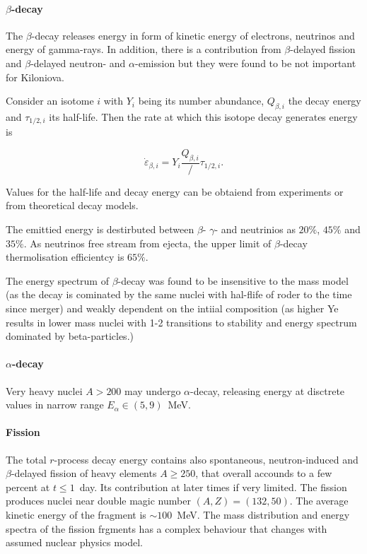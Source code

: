 \documentclass[11pt,a4paper,headinclude=true,DIV=14,BCOR=8mm,chapterprefix,listof=totoc,twoside,openright,abstracton]{scrbook}
\begin{document}
\paragraph{$\beta$-decay}

The $\beta$-decay releases energy in form of kinetic energy of electrons, neutrinos and energy of gamma-rays. In addition, there is a contribution from $\beta$-delayed fission and $\beta$-delayed neutron- and $\alpha$-emission but they were found to be not important for Kiloniova.

Consider an isotome $i$ with $Y_i$ being its number abundance, $Q_{\beta,i}$ the decay energy and $\tau_{1/2, i}$ its half-life. Then the rate at which this isotope decay generates energy is 

\begin{equation}
    \dot{\varepsilon}_{\beta,i} = Y_i \frac{Q_{\beta, i}}/{\tau_{1/2, i}}.
\end{equation}

Values for the half-life and decay energy can be obtaiend from experiments or from theoretical decay models.

The emittied energy is destirbuted between $\beta$- $\gamma$- and neutrinios as $20\%$, $45\%$ and $35\%$. As neutrinos free stream from ejecta, the upper limit of $\beta$-decay thermolisation efficientcy is $65\%$. 

The energy spectrum of $\beta$-decay was found to be insensitive to the mass model (as the decay is cominated by the same nuclei with hal-flife of roder to the time since merger) and weakly dependent on the intiial composition (as higher Ye results in lower mass nuclei with 1-2 transitions to stability and energy spectrum dominated by beta-particles.)

\paragraph{$\alpha$-decay}

Very heavy nuclei $A>200$ may undergo $\alpha$-decay, releasing energy at disctrete values in narrow range $E_{\alpha}\in(5,9)$~MeV.

\paragraph{Fission}

The total $r$-process decay energy contains also spontaneous, neutron-induced and $\beta$-delayed fission of heavy elements $A\geq 250$, that overall accounds to a few percent at $t\leq1$~day. Its contribution at later times if very limited. The fission produces nuclei near double magic number $(A,Z)=(132,50)$. The average kinetic energy of the fragment is $\sim 100$~MeV. The mass distribution and energy spectra of the fission frgments has a complex behaviour that changes with assumed nuclear physics model. 
\end{document}
